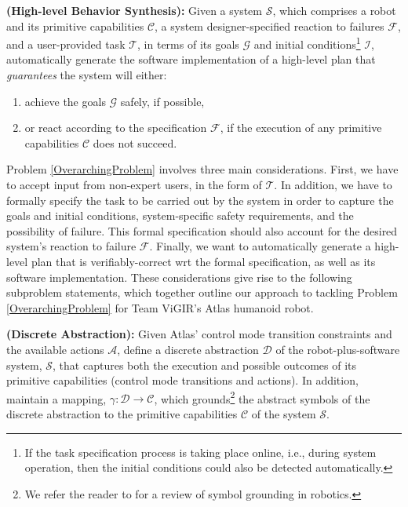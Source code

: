 
\begin{myProblem}\label{OverarchingProblem}
\textbf{(High-level Behavior Synthesis):}
	Given a system $\mathcal{S}$, which comprises a robot and its primitive capabilities $\mathcal{C}$, a system designer-specified reaction to failures $\mathcal{F}$, and a user-provided task $\mathcal{T}$, in terms of its goals $\mathcal{G}$ and initial conditions\footnote{If the task specification process is taking place online, i.e., during system operation, then the initial conditions could also be detected automatically.}
	 $\mathcal{I}$, automatically generate the software implementation of a high-level plan that \emph{guarantees} the system will either:
	\begin{enumerate}[i]
		\item achieve the goals $\mathcal{G}$ safely, if possible,
		\item or react according to the specification $\mathcal{F}$, if the execution of any primitive capabilities $\mathcal{C}$ does not succeed.
	\end{enumerate}
\end{myProblem}

Problem \ref{OverarchingProblem} involves three main considerations.
First, we have to accept input from non-expert users, in the form of $\mathcal{T}$.
In addition, we have to formally specify the task to be carried out by the system in order to capture the goals and initial conditions, system-specific safety requirements, and the possibility of failure.
This formal specification should also account for the desired system's reaction to failure $\mathcal{F}$.
Finally, we want to automatically generate a high-level plan that is verifiably-correct \ac{wrt} the formal specification, as well as its software implementation.
These considerations give rise to the following subproblem statements, which together outline our approach to tackling Problem \ref{OverarchingProblem} for Team ViGIR's Atlas humanoid robot.

\begin{myProblem}\label{DiscreteAbstractionProblem}
\textbf{(Discrete Abstraction):}
Given Atlas' control mode transition constraints and the available actions $\mathcal{A}$, define a discrete abstraction $\mathcal{D}$ of the robot-plus-software system, $\mathcal{S}$, that captures both the execution and possible outcomes of its primitive capabilities (control mode transitions and actions).
In addition, maintain a mapping, $\gamma: \mathcal{D} \rightarrow \mathcal{C}$, which grounds\footnote{We refer the reader to \cite{Grounding2013} for a review of symbol grounding in robotics.}
 the abstract symbols of the discrete abstraction to the primitive capabilities $\mathcal{C}$ of the system $\mathcal{S}$.
\end{myProblem}

